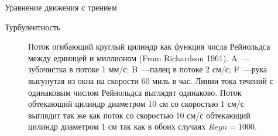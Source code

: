 \begin{chapter}{Уравнение движения с трением}
\begin{section}{Турбулентность}
\begin{figure}[t!]
\caption{Поток огибающий круглый цилиндр как функция числа
Рейнольдса между единицей и миллионом (From Richardson 1961). 
A~--- зубочистка в потоке 1 мм/с; B~---палец в потоке 2 см/с; 
F~---рука высунутая из окна на скорости 60 миль в час. 
Линии тока течений с одинаковым числом Рейнольдса выглядят одинаково. 
Поток обтекающий цилиндр диаметром 10 см со скоростью 1 см/с выглядит 
так же как поток со скоростью 10 см/с обтекающий цилиндр 
диаметром 1 см так как в обоих случаях $Reyn = 1000$.}
\label{fig:turbsketch}
\vspace{-2ex}
\end{figure}
%


\end{section}
\end{chapter}

